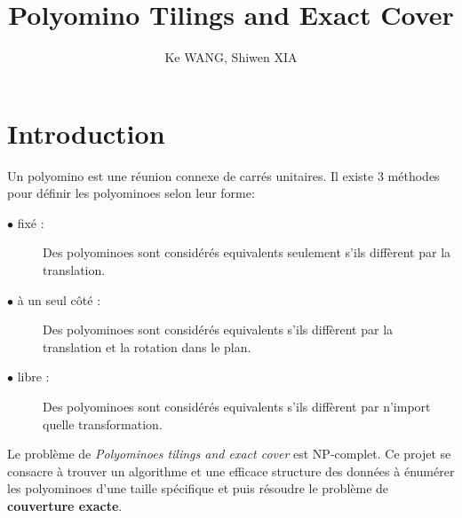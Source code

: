 \documentclass[a4paper,12pt]{article}
\begin{document}
	\title{\vspace{-1.5cm}Polyomino Tilings and Exact Cover}
	\author{Ke WANG, Shiwen XIA}
	\maketitle
	\tableofcontents
	\newpage
	\section{Introduction}
	Un polyomino est une réunion connexe de carrés unitaires. Il existe 3 méthodes pour définir les polyominoes selon leur forme\cite{wikipedia}:
	\begin{description}
		\item[$\bullet$ fixé :] Des polyominoes sont considérés equivalents seulement s'ils diffèrent par la translation.
		\item[$\bullet$ à un seul côté :] Des polyominoes sont considérés equivalents s'ils diffèrent par la translation et la rotation dans le plan.
		\item[$\bullet$ libre :] Des polyominoes sont considérés equivalents s'ils diffèrent par n'import quelle transformation.
	\end{description}
	\par Le problème de \textit{Polyominoes tilings and exact cover} est NP-complet. Ce projet se consacre à trouver un algorithme et une efficace structure des données à énumérer les polyominoes d'une taille spécifique et puis résoudre le problème de \textbf{couverture exacte}.
\end{document}
